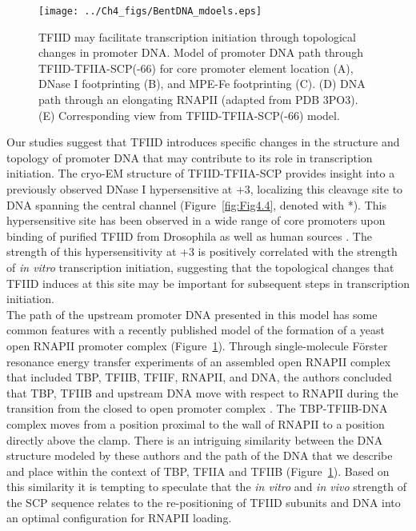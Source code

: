 \begin{figure}
\centering
\texttt{[image: ../Ch4\_figs/BentDNA\_mdoels.eps]}
\caption[TFIID may facilitate transcription initiation through topological changes in promoter DNA]{TFIID may facilitate transcription initiation through topological changes in promoter DNA. Model of promoter DNA path through TFIID-TFIIA-SCP(-66) for core promoter element location (A), DNase I footprinting (B), and MPE-Fe footprinting (C).  (D) DNA path through an elongating RNAPII (adapted from PDB 3PO3). (E) Corresponding view from TFIID-TFIIA-SCP(-66) model.}
\label{fig:BentDNA}
\end{figure}

Our studies suggest that TFIID introduces specific changes in the structure and topology of promoter DNA that may contribute to its role in transcription initiation.  The cryo-EM structure of TFIID-TFIIA-SCP provides insight into a previously observed DNase I hypersensitive at +3, localizing this cleavage site to DNA spanning the central channel (Figure~\ref{fig:Fig4.4}, denoted with *).  This hypersensitive site has been observed in a wide range of core promoters upon binding of purified TFIID from Drosophila \cite{Burke_3081,Kutach_2124,Lim_1522,Parry_382,Purnell_3259,Theisen_341} as well as human sources \cite{Chi_3023,Juven-Gershon_1249,Kaufmann_3320,Lieberman_2671,Oelgeschlager_2880}.  The strength of this hypersensitivity at +3 is positively correlated with the strength of \emph{in vitro} transcription initiation, suggesting that the topological changes that TFIID induces at this site may be important for subsequent steps in transcription initiation.  \\
\indent The path of the upstream promoter DNA presented in this model has some common features with a recently published model \cite{Treutlein_2} of the formation of a yeast open RNAPII promoter complex (Figure~\ref{fig:BentDNA}).  Through single-molecule F\"{o}rster resonance energy transfer experiments of an assembled open RNAPII complex that included TBP, TFIIB, TFIIF, RNAPII, and DNA, the authors concluded that TBP, TFIIB and upstream DNA move with respect to RNAPII during the transition from the closed to open promoter complex \cite{Treutlein_2}.  The TBP-TFIIB-DNA complex moves from a position proximal to the wall of RNAPII to a position directly above the clamp. There is an intriguing similarity between the DNA structure modeled by these authors \cite{Treutlein_2} and the path of the DNA that we describe and place within the context of TBP, TFIIA and TFIIB (Figure~\ref{fig:BentDNA}). Based on this similarity it is tempting to speculate that the \emph{in vitro} and \emph{in vivo} strength of the SCP sequence relates to the re-positioning of TFIID subunits and DNA into an optimal configuration for RNAPII loading.
